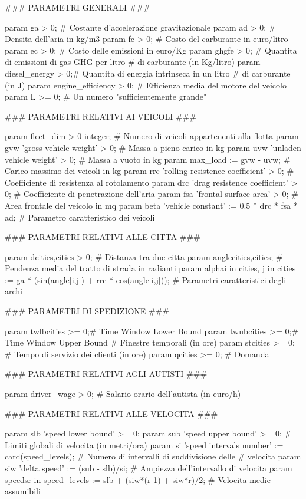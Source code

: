 			\begin{amplcode}
				### PARAMETRI GENERALI ###

				param ga > 0;			# Costante d'accelerazione gravitazionale
				param ad > 0; 			# Densita dell'aria in kg/m3
				param fc > 0;			# Costo del carburante in euro/litro
				param ec > 0;			# Costo delle emissioni in euro/Kg
				param ghgfe > 0;		# Quantita di emissioni di gas GHG per litro
										# di carburante (in Kg/litro)
				param diesel_energy > 0;# Quantita di energia intrinseca in un litro
										# di carburante (in J)
				param engine_efficiency > 0;
										# Efficienza media del motore del veicolo
				param L >= 0;			# Un numero "sufficientemente grande"


				### PARAMETRI RELATIVI AI VEICOLI ###

				param fleet_dim > 0 integer;	
										# Numero di veicoli appartenenti alla flotta
				param gvw 'gross vehicle weight' > 0;				
										# Massa a pieno carico in kg
				param uvw 'unladen vehicle weight' > 0;
										# Massa a vuoto in kg
				param max_load := gvw - uvw;	# Carico massimo dei veicoli in kg
				param rrc 'rolling resistence coefficient' > 0;
										# Coefficiente di resistenza al rotolamento
				param drc 'drag resistence coefficient' > 0;
										# Coefficiente di penetrazione dell'aria
				param fsa 'frontal surface area' > 0;
										# Area frontale del veicolo in mq
				param beta 'vehicle constant' := 0.5 * drc * fsa * ad;										# Parametro caratteristico dei veicoli
											
											
				### PARAMETRI RELATIVI ALLE CITTA ###

				param d{cities,cities} > 0; 	
										# Distanza tra due citta
				param angle{cities,cities};		
										# Pendenza media del tratto di strada in radianti
				param alpha{i in cities, j in cities} := 
					ga * (sin(angle[i,j]) + rrc * cos(angle[i,j]));
										# Parametri caratteristici degli archi


				### PARAMETRI DI SPEDIZIONE ###

				param twlb{cities} >= 0;# Time Window Lower Bound
				param twub{cities} >= 0;# Time Window Upper Bound
										# Finestre temporali (in ore)
				param st{cities} >= 0;	# Tempo di servizio dei clienti (in ore)
				param q{cities} >= 0;	# Domanda


				### PARAMETRI RELATIVI AGLI AUTISTI ###

				param driver_wage > 0; 	# Salario orario dell'autista (in euro/h)


				### PARAMETRI RELATIVI ALLE VELOCITA ###

				param slb 'speed lower bound' >= 0;
				param sub 'speed upper bound' >= 0;
										# Limiti globali di velocita (in metri/ora)
				param si 'speed intervals number' := card(speed_levels);
										# Numero di intervalli di suddivisione delle 
										# velocita
				param siw 'delta speed' := (sub - slb)/si;
										# Ampiezza dell'intervallo di velocita
				param speeds{r in speed_levels} := slb + (siw*(r-1) + siw*r)/2;
										# Velocita medie assumibili
		
			\end{amplcode}

